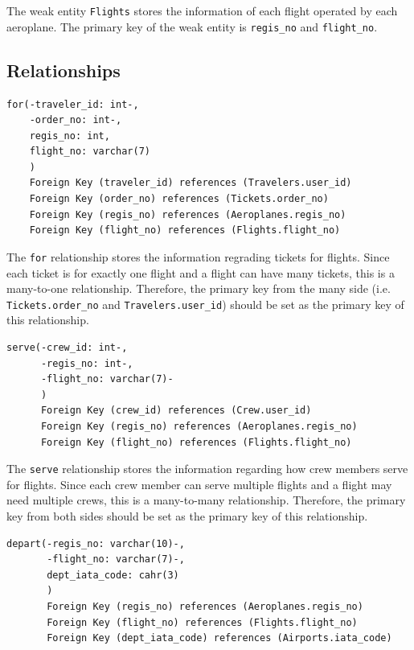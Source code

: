\documentclass{article}
\begin{document}
	The weak entity \texttt{Flights} stores the information of each flight operated by each aeroplane. The primary key of the weak entity is \texttt{regis\_no} and \texttt{flight\_no}.

	\subsection{Relationships}
	
	\begin{lstlisting}[keepspaces=true]
for(-traveler_id: int-, 
    -order_no: int-,
    regis_no: int, 
    flight_no: varchar(7)
    )
    Foreign Key (traveler_id) references (Travelers.user_id)
    Foreign Key (order_no) references (Tickets.order_no)
    Foreign Key (regis_no) references (Aeroplanes.regis_no)
    Foreign Key (flight_no) references (Flights.flight_no)
	\end{lstlisting}    

	The \texttt{for} relationship stores the information regrading tickets for flights. Since each ticket is for exactly one flight and a flight can have many tickets, this is a many-to-one relationship. Therefore, the primary key from the many side (i.e. \texttt{Tickets.order\_no} and \texttt{Travelers.user\_id}) should be set as the primary key of this relationship.

	\begin{lstlisting}[keepspaces=true]        
serve(-crew_id: int-, 
      -regis_no: int-, 
      -flight_no: varchar(7)-
      )
      Foreign Key (crew_id) references (Crew.user_id)
      Foreign Key (regis_no) references (Aeroplanes.regis_no)
      Foreign Key (flight_no) references (Flights.flight_no)
	\end{lstlisting}    

	The \texttt{serve} relationship stores the information regarding how crew members serve for flights. Since each crew member can serve multiple flights and a flight may need multiple crews, this is a many-to-many relationship. Therefore, the primary key from both sides should be set as the primary key of this relationship.

	\begin{lstlisting}[keepspaces=true] 
depart(-regis_no: varchar(10)-,
       -flight_no: varchar(7)-,
       dept_iata_code: cahr(3)
       )  
       Foreign Key (regis_no) references (Aeroplanes.regis_no)
       Foreign Key (flight_no) references (Flights.flight_no)
       Foreign Key (dept_iata_code) references (Airports.iata_code)
	\end{lstlisting}    
\end{document}
